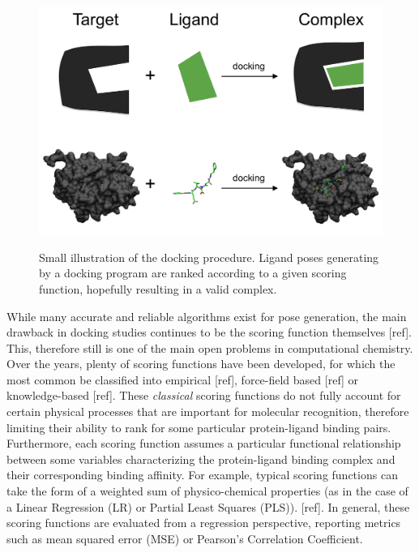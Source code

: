 \documentclass[10pt,a4paper,twoside]{book}
\begin{document}
\begin{figure}
\centering
\caption{Small illustration of the docking procedure. Ligand poses generating by a docking program are ranked according to a given scoring function, hopefully resulting in a valid complex.}
\includegraphics[scale=0.45]{figures/chapter4/docking}
\label{fig:docking}
\end{figure}

While many accurate and reliable algorithms exist for pose generation, the main drawback in docking studies continues to be the scoring function themselves [ref]. This, therefore still is one of the main open problems in computational chemistry. Over the years, plenty of scoring functions have been developed, for which the most common be classified into empirical [ref], force-field based [ref] or knowledge-based [ref]. These \textit{classical} scoring functions do not fully account for certain physical processes that are important for molecular recognition, therefore limiting their ability to rank for some particular protein-ligand binding pairs. Furthermore, each scoring function assumes a particular functional relationship between some variables characterizing the protein-ligand binding complex and their corresponding binding affinity. For example, typical scoring functions can take the form of a weighted sum of physico-chemical properties (as in the case of a Linear Regression (LR) or Partial Least Squares (PLS)). [ref]. In general, these scoring functions are evaluated from a regression perspective, reporting metrics such as mean squared error (MSE) or Pearson's Correlation Coefficient. \\
\end{document}

